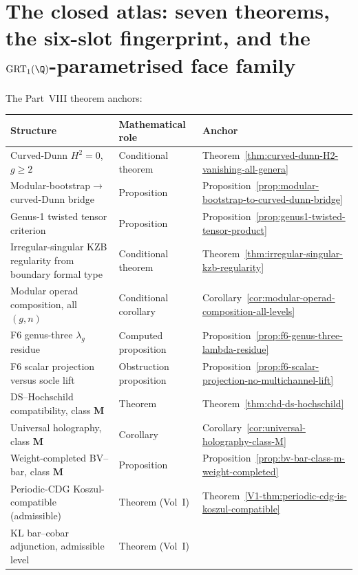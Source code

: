 \section{The closed atlas: seven theorems, the six-slot fingerprint,
and the $\mathrm{GRT}_{1}(\Q)$-parametrised face family}
\label{sec:part-viii-concordance}

The Part~VIII theorem anchors:

\begin{center}
\renewcommand{\arraystretch}{1.18}
\begin{tabular}{@{}p{}p{}p{}@{}}
\toprule
\textbf{Structure} & \textbf{Mathematical role} & \textbf{Anchor} \\
\midrule
Curved-Dunn $H^{2}=0$, $g \ge 2$ & Conditional theorem &
 Theorem~\ref{thm:curved-dunn-H2-vanishing-all-genera} \\
Modular-bootstrap$\to$curved-Dunn bridge & Proposition &
 Proposition~\ref{prop:modular-bootstrap-to-curved-dunn-bridge} \\
Genus-1 twisted tensor criterion & Proposition &
 Proposition~\ref{prop:genus1-twisted-tensor-product} \\
Irregular-singular KZB regularity from boundary formal type & Conditional theorem &
 Theorem~\ref{thm:irregular-singular-kzb-regularity} \\
Modular operad composition, all $(g,n)$ & Conditional corollary &
 Corollary~\ref{cor:modular-operad-composition-all-levels} \\
F6 genus-three $\lambda_g$ residue & Computed proposition &
 Proposition~\ref{prop:f6-genus-three-lambda-residue} \\
F6 scalar projection versus socle lift & Obstruction proposition &
 Proposition~\ref{prop:f6-scalar-projection-no-multichannel-lift} \\
DS--Hochschild compatibility, class $\mathbf{M}$ & Theorem &
 Theorem~\ref{thm:chd-ds-hochschild} \\
Universal holography, class $\mathbf{M}$ & Corollary &
 Corollary~\ref{cor:universal-holography-class-M} \\
Weight-completed BV--bar, class $\mathbf{M}$ & Proposition &
 Proposition~\ref{prop:bv-bar-class-m-weight-completed} \\
Periodic-CDG Koszul-compatible (admissible) & Theorem (Vol~I) &
 Theorem~\ref*{V1-thm:periodic-cdg-is-koszul-compatible} \\
KL bar--cobar adjunction, admissible level & Theorem (Vol~I) &

\end{tabular}
\end{center}
